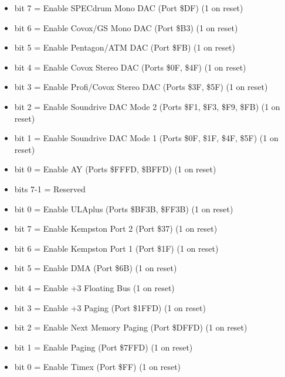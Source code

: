 \begin{itemize}
\item bit 7 = Enable SPECdrum Mono DAC (Port \$DF) (1 on reset)
\item bit 6 = Enable Covox/GS Mono DAC (Port \$B3) (1 on reset)
\item bit 5 = Enable Pentagon/ATM DAC (Port \$FB) (1 on reset)
\item bit 4 = Enable Covox Stereo DAC (Ports \$0F, \$4F) (1 on reset)
\item bit 3 = Enable Profi/Covox Stereo DAC (Ports \$3F, \$5F) (1 on
  reset)
\item bit 2 = Enable Soundrive DAC Mode 2 (Ports \$F1, \$F3, \$F9,
  \$FB) (1 on reset)
\item bit 1 = Enable Soundrive DAC Mode 1 (Ports \$0F, \$1F, \$4F,
  \$5F) (1 on reset)
\item bit 0 = Enable AY (Ports \$FFFD, \$BFFD) (1 on reset)
\end{itemize}

\begin{itemize}
\item bits 7-1 = Reserved
\item bit 0 = Enable ULAplus (Ports \$BF3B, \$FF3B) (1 on reset)
\end{itemize}

\begin{itemize}
\item bit 7 = Enable Kempston Port 2 (Port \$37) (1 on reset)
\item bit 6 = Enable Kempston Port 1 (Port \$1F) (1 on reset)
\item bit 5 = Enable DMA (Port \$6B) (1 on reset)
\item bit 4 = Enable +3 Floating Bus (1 on reset)
\item bit 3 = Enable +3 Paging (Port \$1FFD) (1 on reset)
\item bit 2 = Enable Next Memory Paging (Port \$DFFD) (1 on reset)
\item bit 1 = Enable Paging (Port \$7FFD) (1 on reset)
\item bit 0 = Enable Timex (Port \$FF) (1 on reset)
\end{itemize}

